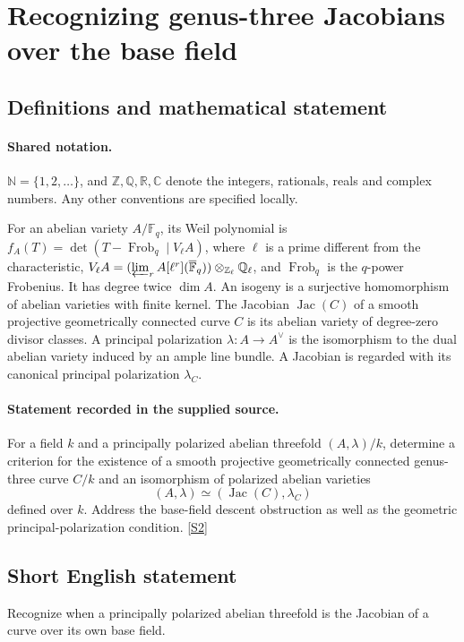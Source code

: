 \documentclass[11pt]{article}
\newcommand{\sref}[2]{\hyperlink{source:#1:#2}{[S#2]}}
\begin{document}
\section{Recognizing genus-three Jacobians over the base field}\label{statement}

\subsection{Definitions and mathematical statement}

\paragraph{Shared notation.}$\mathbb N=\{1,2,\ldots\}$, and $\mathbb Z,\mathbb Q,\mathbb R,\mathbb C$ denote the integers, rationals, reals and complex numbers. Any other conventions are specified locally.


For an abelian variety $A/\mathbb F_q$, its Weil polynomial is $f_A(T)=\det(T-\operatorname{Frob}_q\mid V_\ell A)$, where $\ell$ is a prime different from the characteristic, $V_\ell A=(\varprojlim_r A[\ell^r](\overline{\mathbb F}_q))\otimes_{\mathbb Z_\ell}\mathbb Q_\ell$, and $\operatorname{Frob}_q$ is the $q$-power Frobenius. It has degree twice $\dim A$. An isogeny is a surjective homomorphism of abelian varieties with finite kernel. The Jacobian $\operatorname{Jac}(C)$ of a smooth projective geometrically connected curve $C$ is its abelian variety of degree-zero divisor classes. A principal polarization $\lambda:A\to A^\vee$ is the isomorphism to the dual abelian variety induced by an ample line bundle. A Jacobian is regarded with its canonical principal polarization $\lambda_C$.
\paragraph{Statement recorded in the supplied source.}
For a field $k$ and a principally polarized abelian threefold $(A,\lambda)/k$, determine a criterion for the existence of a smooth projective geometrically connected genus-three curve $C/k$ and an isomorphism of polarized abelian varieties
\[
(A,\lambda)\simeq(\operatorname{Jac}(C),\lambda_C)
\]
defined over $k$. Address the base-field descent obstruction as well as the geometric principal-polarization condition. \sref{statement}{2}

\subsection{Short English statement}
Recognize when a principally polarized abelian threefold is the Jacobian of a curve over its own base field.
\end{document}
